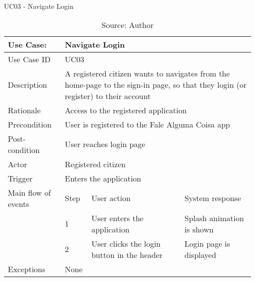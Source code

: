 \begin{table}[ht]
\centering
\caption{UC03 - Navigate Login}
\label{uc:03}
\begin{tabular}{|p{3cm}|p{1cm}|p{5cm}|p{5cm}|}
\hline
Use Case:       & \multicolumn{3}{p{11cm}|}{Navigate Login} \\ \hline
Use Case ID     & \multicolumn{3}{p{11cm}|}{UC03} \\ \hline
Description     & \multicolumn{3}{p{11cm}|}{A registered citizen wants to navigates from the home-page to the sign-in page, so that they login (or register) to their account} \\ \hline
Rationale       & \multicolumn{3}{p{11cm}|}{Access to the registered application} \\ \hline
Precondition    & \multicolumn{3}{p{11cm}|}{User is registered to the Fale Alguma Coisa app} \\ \hline
Post-condition  & \multicolumn{3}{p{11cm}|}{User reaches login page} \\ \hline
Actor           & \multicolumn{3}{p{11cm}|}{Registered citizen} \\ \hline
Trigger         & \multicolumn{3}{p{11cm}|}{Enters the application} \\ \hline
Main flow of events & Step  & User action & System response \\ \hline
                    & 1     & User enters the application & Splash animation is shown \\ \hline
                    & 2     & User clicks the login button in the header & Login page is displayed \\ \hline
Exceptions      & \multicolumn{3}{p{11cm}|}{None} \\ \hline
\end{tabular}
\caption*{Source: Author}
\end{table}


